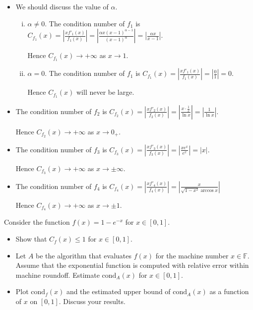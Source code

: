 \documentclass[11pt]{elegantbook}
\begin{document}
\begin{solution}
  \begin{itemize}
    \item We should discuss the value of $\alpha$.
    \begin{enumerate}[(i)]
      \item $\alpha\neq 0$. The condition number of $f_1$ is $C_{f_1}(x)=\left|\frac{xf'_1(x)}{f_1(x)}\right|=\left|\frac{\alpha x(x-1)^{\alpha-1}}{(x-1)^\alpha}\right|=\left|\frac{\alpha x}{x-1}\right|.$

      Hence $C_{f_1}(x)\to +\infty$ as $x\to 1$.
      \item $\alpha=0$. The condition number of $f_1$ is $C_{f_1}(x)=\left|\frac{xf'_1(x)}{f_1(x)}\right|=\left|\frac{0}{1}\right|=0.$

      Hence $C_{f_1}(x)$ will never be large.
    \end{enumerate}
    \item The condition number of $f_2$ is $C_{f_2}(x)=\left|\frac{xf'_2(x)}{f_2(x)}\right|=\left|\frac{x \cdot \frac{1}{x}}{\ln x}\right|=\left| \frac{1}{\ln x} \right|.$
    
    Hence $C_{f_2}(x)\to +\infty$ as $x\to 0_+$.
    \item The condition number of $f_3$ is $C_{f_3}(x)=\left|\frac{xf'_3(x)}{f_3(x)}\right|=\left|\frac{x e^x}{e^x}\right|=\left|x \right|.$

    Hence $C_{f_3}(x)\to +\infty$ as $x\to \pm \infty$.
    \item The condition number of $f_4$ is $C_{f_4}(x)=\left|\frac{xf'_4(x)}{f_4(x)}\right|=\left| \frac{x}{\sqrt{1-x^2}\arccos x} \right|$

    Hence $C_{f_4}(x)\to +\infty$ as $x\to \pm 1$.
  \end{itemize}
\end{solution}

\vspace{1em}

\begin{problem}
  Consider the function $f(x)=1-e^{-x}$ for $x\in[0,1]$.
  \begin{itemize}
    \item Show that $C_f(x)\leq 1$ for $x\in[0,1]$.
    \item Let $A$ be the algorithm that evaluates $f(x)$ for the machine number $x\in\mathbb{F}$. Assume that the exponential function is computed with relative error within machine roundoff. Estimate $\text{cond}_A(x)$ for $x\in[0,1]$.
    \item Plot $\text{cond}_f(x)$ and the estimated upper bound of $\text{cond}_A(x)$ as a function of $x$ on $[0,1]$. Discuss your results.
  \end{itemize}
\end{problem}
\end{document}
